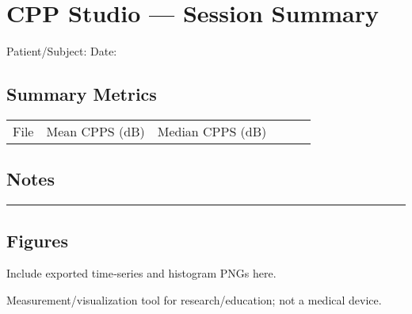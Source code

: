 \documentclass[11pt]{article}
\begin{document}
\section*{CPP Studio — Session Summary}
Patient/Subject: \underline{\hspace{3in}} \hfill Date: \underline{\hspace{1in}}


\subsection*{Summary Metrics}
\begin{tabular}{@{}llllll@{}}
\toprule
File & Mean CPPS (dB) & Median CPPS (dB) & %
\midrule
\bottomrule
\end{tabular}


\subsection*{Notes}
\vspace{2em}
\noindent\rule{\textwidth}{0.4pt}


\subsection*{Figures}
Include exported time‑series and histogram PNGs here.


\vfill
\footnotesize{Measurement/visualization tool for research/education; not a medical device.}
\end{document}

